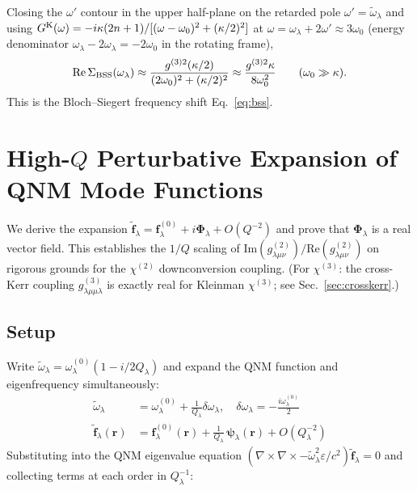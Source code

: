 \documentclass[12pt]{article}
\newcommand{\Keldysh}{{\rm K}}
\newcommand{\BSS}{{\rm BSS}}
\newcommand{\tf}{\tilde{\mathbf{f}}}
\newcommand{\tomega}{\tilde{\omega}}
\begin{document}
Closing the $\omega'$ contour in the upper half-plane on the retarded
pole $\omega'=\tomega_\lambda$ and using
$G^\Keldysh(\omega) = -i\kappa(2n+1)/[(\omega-\omega_0)^2+(\kappa/2)^2]$
at $\omega=\omega_\lambda+2\omega'\approx 3\omega_0$ (energy denominator
$\omega_\lambda-2\omega_\lambda = -2\omega_0$ in the rotating frame),
\begin{equation}
  \mathrm{Re}\,\Sigma_\BSS(\omega_\lambda) \approx
  \frac{g^{(3)2}(\kappa/2)}{(2\omega_0)^2+(\kappa/2)^2}
  \approx \frac{g^{(3)2}\kappa}{8\omega_0^2}
  \qquad (\omega_0\gg\kappa).
\end{equation}
This is the Bloch--Siegert frequency shift Eq.~\eqref{eq:bss}.

\section{High-$Q$ Perturbative Expansion of QNM Mode Functions}
\label{app:highQ}

We derive the expansion $\tf_\lambda=\mathbf{f}^{(0)}_\lambda+i\mathbf{\Phi}_\lambda
+O(Q^{-2})$ and prove that $\mathbf{\Phi}_\lambda$ is a real vector field.
This establishes the $1/Q$ scaling of $\mathrm{Im}(g^{(2)}_{\lambda\mu\nu})/
\mathrm{Re}(g^{(2)}_{\lambda\mu\nu})$ on rigorous grounds for the $\chi^{(2)}$
downconversion coupling.  (For $\chi^{(3)}$: the cross-Kerr coupling
$g^{(3)}_{\lambda\mu\mu\lambda}$ is exactly real for Kleinman $\chi^{(3)}$;
see Sec.~\ref{sec:crosskerr}.)

\subsection*{Setup}

Write $\tomega_\lambda = \omega_\lambda^{(0)}(1-i/2Q_\lambda)$ and expand the
QNM function and eigenfrequency simultaneously:
\begin{align}
  \tomega_\lambda &= \omega_\lambda^{(0)} + \frac{1}{Q_\lambda}\delta\omega_\lambda,
  \quad \delta\omega_\lambda = -\frac{i\omega_\lambda^{(0)}}{2}
  \label{eq:omega_expand}\\
  \tf_\lambda(\mathbf{r}) &= \mathbf{f}^{(0)}_\lambda(\mathbf{r})
  + \frac{1}{Q_\lambda}\,\boldsymbol{\psi}_\lambda(\mathbf{r})
  + O(Q_\lambda^{-2})
  \label{eq:f_expand}
\end{align}
Substituting into the QNM eigenvalue equation
$(\nabla\times\nabla\times - \tomega_\lambda^2\varepsilon/c^2)\tf_\lambda=0$
and collecting terms at each order in $Q_\lambda^{-1}$:
\end{document}
